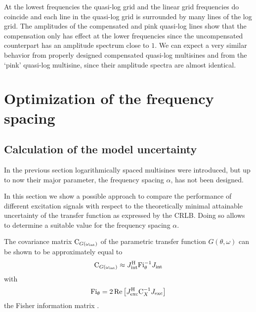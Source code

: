 
  At the lowest frequencies the quasi-log grid and the linear grid frequencies do coincide and each line in the quasi-log grid is surrounded by many lines of the log grid.
  The amplitudes of the compensated and pink quasi-log lines show that the compensation only has effect at the lower frequencies since the uncompensated counterpart has an amplitude spectrum close to $1$.
  We can expect a very similar behavior from properly designed compensated quasi-log multisines and from the `pink' quasi-log multisine, since their amplitude spectra are almost identical.

\section{Optimization of the frequency spacing} \label{sec:optimAlpha}
  \subsection{Calculation of the model uncertainty}
  In the previous section logarithmically spaced multisines were introduced, but up to now their major parameter, the frequency spacing $\alpha$, has not been designed.

  In this section we show a possible approach to compare the performance of different excitation signals with respect to the theoretically minimal attainable uncertainty of the transfer function as expressed by the \gls{CRLB}.
  Doing so allows to determine a suitable value for the frequency spacing $\alpha$.


  The covariance matrix $\mathrm{C}_{G\left(\omega_{\mathrm{int}}\right)}$ of the parametric transfer function $G(\theta,\omega)$ can be shown \citep{Pintelon2012, Gallager2008, matrixcookbook} to be approximately equal to
  \begin{align}
    \C_{G\left( \omega_{\interest}\right) } \approx
      \InnerQuadraticForm[\HT]
                         {\jac{\interest}}
                         {\FisherInformation_{\theta}^{-1}}
     \label{eq:varPeak}
  \end{align}
  with 
  \begin{equation}
    \FisherInformation_{\theta} =
    2
    \real{
          \InnerQuadraticForm[\HT]
                              {\jac{\excited}}
                              {\C_{X}^{-1}}
          }
    \label{eq:FisherInfo}
  \end{equation}
  the Fisher information matrix \citep{Pintelon2012}.

